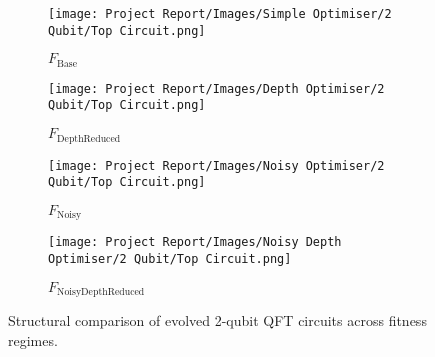 \documentclass[11pt,a4paper]{article}
\begin{document}
\begin{figure}[H]
    \centering
    \begin{subfigure}[t]{0.49\textwidth}
        \centering
        \texttt{[image: Project Report/Images/Simple Optimiser/2 Qubit/Top Circuit.png]}
        \caption{$F_{\mathrm{Base}}$}
        \label{fig:struct_base}
    \end{subfigure}
    \hfill
    \begin{subfigure}[t]{0.49\textwidth}
        \centering
        \texttt{[image: Project Report/Images/Depth Optimiser/2 Qubit/Top Circuit.png]}
        \caption{$F_{\mathrm{DepthReduced}}$}
        \label{fig:struct_depth}
    \end{subfigure}

    \vspace{1em}

    \begin{subfigure}[t]{0.49\textwidth}
        \centering
        \texttt{[image: Project Report/Images/Noisy Optimiser/2 Qubit/Top Circuit.png]}
        \caption{$F_{\mathrm{Noisy}}$}
        \label{fig:struct_noisy}
    \end{subfigure}
    \hfill
    \begin{subfigure}[t]{0.49\textwidth}
        \centering
        \texttt{[image: Project Report/Images/Noisy Depth Optimiser/2 Qubit/Top Circuit.png]}
        \caption{$F_{\mathrm{NoisyDepthReduced}}$}
        \label{fig:struct_noisydepth}
    \end{subfigure}

    \caption{Structural comparison of evolved 2-qubit QFT circuits across fitness regimes.}
    \label{fig:structural_comparison_2q}
\end{figure}
\end{document}
